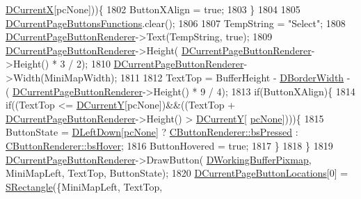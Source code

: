 \begin{DoxyCode}
      \hyperlink{classCApplicationData_a1dc7ee482a39f7978c71365ac540f97a}{DCurrentX}[pcNone]))\{
1802         ButtonXAlign = \textcolor{keyword}{true};
1803     \}
1804     
1805     \hyperlink{classCApplicationData_ad3079e5563a19d21c1e4ceff2a188382}{DCurrentPageButtonsFunctions}.clear();
1806     
1807     TempString = \textcolor{stringliteral}{"Select"};
1808     \hyperlink{classCApplicationData_abfe1743f2634b069ccc811db4a8733a8}{DCurrentPageButtonRenderer}->Text(TempString, \textcolor{keyword}{true});   
1809     \hyperlink{classCApplicationData_abfe1743f2634b069ccc811db4a8733a8}{DCurrentPageButtonRenderer}->Height(
      \hyperlink{classCApplicationData_abfe1743f2634b069ccc811db4a8733a8}{DCurrentPageButtonRenderer}->Height() * 3 / 2);
1810     \hyperlink{classCApplicationData_abfe1743f2634b069ccc811db4a8733a8}{DCurrentPageButtonRenderer}->Width(MiniMapWidth);
1811     
1812     TextTop = BufferHeight - \hyperlink{classCApplicationData_a566b69c72fa982c6ecf8e47dc21df489}{DBorderWidth} - (
      \hyperlink{classCApplicationData_abfe1743f2634b069ccc811db4a8733a8}{DCurrentPageButtonRenderer}->Height() * 9 / 4);
1813     \textcolor{keywordflow}{if}(ButtonXAlign)\{
1814         \textcolor{keywordflow}{if}((TextTop <= \hyperlink{classCApplicationData_a0ba39779ae11c8072258c6ddfebd6052}{DCurrentY}[pcNone])&&((TextTop + 
      \hyperlink{classCApplicationData_abfe1743f2634b069ccc811db4a8733a8}{DCurrentPageButtonRenderer}->Height() > \hyperlink{classCApplicationData_a0ba39779ae11c8072258c6ddfebd6052}{DCurrentY}[
      \hyperlink{GameDataTypes_8h_aafb0ca75933357ff28a6d7efbdd7602fa88767aa8e02c7b3192bbab4127b3d729}{pcNone}])))\{
1815             ButtonState = \hyperlink{classCApplicationData_a2b943f18557c3e4c8cd4550e22e028b6}{DLeftDown}[\hyperlink{GameDataTypes_8h_aafb0ca75933357ff28a6d7efbdd7602fa88767aa8e02c7b3192bbab4127b3d729}{pcNone}] ? 
      \hyperlink{classCButtonRenderer_ae0eccda184600f6e14bfd59033e5e9a1a8fad69630f3700a97a0c51bcbb4441b5}{CButtonRenderer::bsPressed} : \hyperlink{classCButtonRenderer_ae0eccda184600f6e14bfd59033e5e9a1ad6758a415bde0eee152a0e2f7d07e3b6}{CButtonRenderer::bsHover};
1816             ButtonHovered = \textcolor{keyword}{true};
1817         \}
1818     \}
1819     \hyperlink{classCApplicationData_abfe1743f2634b069ccc811db4a8733a8}{DCurrentPageButtonRenderer}->DrawButton(
      \hyperlink{classCApplicationData_afa34cf2780f38dd28c0c811e69d60a97}{DWorkingBufferPixmap}, MiniMapLeft, TextTop, ButtonState);
1820     \hyperlink{classCApplicationData_a3615df8e23cea3ce17f11cf61340a7b4}{DCurrentPageButtonLocations}[0] = \hyperlink{structSRectangle}{SRectangle}(\{MiniMapLeft, TextTop,

\end{DoxyCode}
